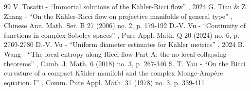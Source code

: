 \begin{thebibliography}{99}
 V. Tosatti - “Immortal solutions of the Kähler-Ricci flow” , 2024
 G. Tian \& Z. Zhang - “On the Kähler-Ricci flow on projective manifolds of general type” , Chinese Ann. Math. Ser. B 27 (2006) no. 2, p. 179-192
 D.-V. Vu - “Continuity of functions in complex Sobolev spaces” , Pure Appl. Math. Q 20 (2024) no. 6, p. 2769-2780
 D.-V. Vu - “Uniform diameter estimates for Kähler metrics” , 2024
 B. Wang - “The local entropy along Ricci flow Part A: the no-local-collapsing theorems” , Camb. J. Math. 6 (2018) no. 3, p. 267-346
 S. T. Yau - “On the Ricci curvature of a compact Kähler manifold and the complex Monge-Ampère equation. I” , Comm. Pure Appl. Math. 31 (1978) no. 3, p. 339-411
\end{thebibliography}
